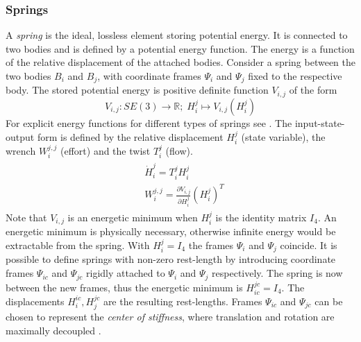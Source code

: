 \documentclass[a4paper,twoside, openright,12pt]{report}
\begin{document}
\subsubsection{Springs}
A \emph{spring} is the ideal, lossless element storing potential energy. It is connected to two bodies and is defined by a potential energy function. The energy is a function of the relative displacement of the attached bodies. Consider a spring between the two bodies $ B_i $ and $ B_j $,  with coordinate frames $ \Psi_i $ and $ \Psi_j $ fixed to the respective body. The stored potential energy is positive definite function $V_{i,j}$ of the form 
\begin{equation}
	V_{i,j} : SE(3) \rightarrow \mathbb{R}; \; H_i^j \mapsto V_{i,j}(H_i^j)
\end{equation}
For explicit energy functions for different types of springs see \cite{Stramigioli_01b}.
The input-state-output form is defined by the relative displacement $H_i^j$ (state variable), the wrench $W_i^{j,j}$ (effort) and the twist $T_i^j$ (flow).
\begin{eqnarray}
\begin{aligned}
	&\dot{H}_i^j = T_i^{j}H_i^j\\
	&W_i^{j,j} = \frac{\partial V_{i,j}}{\partial H_i^j}(H_i^j)^T
\end{aligned}
\end{eqnarray}
Note that $ V_{i,j} $ is an energetic minimum when $ H_i^j $ is the identity matrix $I_4$. An energetic minimum is physically necessary, otherwise infinite energy would be extractable from the spring. With $ H_i^j = I_4 $ the frames $ \Psi_i $ and $\Psi_j$ coincide.
It is possible to define springs with non-zero rest-length by introducing coordinate frames $ \Psi_{ic} $ and $\Psi_{jc}$ rigidly attached to $ \Psi_i $ and $\Psi_j$ respectively. The spring is now between the new frames, thus the energetic minimum is $H_{ic}^{jc} = I_4$. The displacements $ H_i^{ic}, H_j^{jc} $ are the resulting rest-lengths. Frames $ \Psi_{ic} $ and $\Psi_{jc}$ can be chosen to represent the \emph{center of stiffness}, where translation and rotation are maximally decoupled \cite{Stramigioli_99}.
\end{document}
